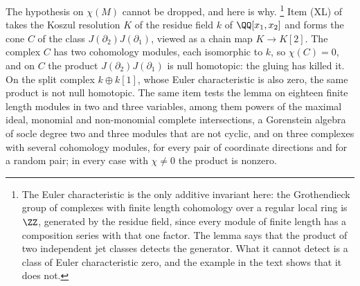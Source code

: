 The hypothesis on $\chi(M)$ cannot be dropped, and here is why.%
\footnote{The Euler characteristic is the only additive invariant here: the
Grothendieck group of complexes with finite length cohomology over a regular
local ring is $\ZZ$, generated by the residue field, since every module of
finite length has a composition series with that one factor. The lemma says
that the product of two independent jet classes detects the generator. What
it cannot detect is a class of Euler characteristic zero, and the example in
the text shows that it does not.}
Item (XL) of  takes the Koszul resolution $K$ of the
residue field $k$ of $\QQ[x_{1},x_{2}]$ and forms the cone $C$ of the class
$J(\partial_{2})J(\partial_{1})$, viewed as a chain map $K\to K[2]$. The
complex $C$ has two cohomology modules, each isomorphic to $k$, so
$\chi(C)=0$, and on $C$ the product $J(\partial_{2})J(\partial_{1})$ is null
homotopic: the gluing has killed it. On the split complex $k\oplus k[1]$,
whose Euler characteristic is also zero, the same product is not null
homotopic. The same item tests the lemma on eighteen finite length modules in
two and three variables, among them powers of the maximal ideal, monomial and
non-monomial complete intersections, a Gorenstein algebra of socle degree two
and three modules that are not cyclic, and on three complexes with several
cohomology modules, for every pair of coordinate directions and for a random
pair; in every case with $\chi\ne0$ the product is nonzero.


